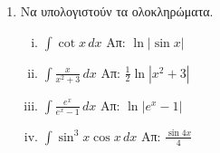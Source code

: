 \begin{enumerate}
\item Να υπολογιστούν τα ολοκληρώματα.

\begin{enumerate}[i)]
\item $\int \cot x \, dx$ \hfill Απ: $\ln|\sin x|$
\item $\int\frac{x}{x^2+3} \, dx$ \hfill Απ: $\frac{1}{2}\ln|x^2+3|$
\item $\int \frac{e^x}{e^x-1} \, dx$ \hfill Απ: $\ln|e^x-1|$
\item $\int \sin^3x\cos x \, dx$ \hfill Απ: $\frac{\sin4x}{4}$
\end{enumerate}



\end{enumerate}







